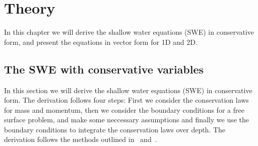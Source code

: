 \chapter{Theory}
In this chapter we will derive the shallow water equations (SWE) in conservative form, and present the equations in vector form for 1D and 2D.



\section{The SWE with conservative variables}
In this section we will derive the shallow water equations (SWE) in conservative form.
The derivation follows four steps: First we consider the conservation laws for mass and momentum, then we consider the boundary conditions for a free surface problem, and make some neccessary assumptions and finally we use the boundary conditions to integrate the conservation laws over depth.
The derivation follows the methods outlined in~\cite{Toro2001-Shock} and~\cite{Vreugdenhil1994}.

